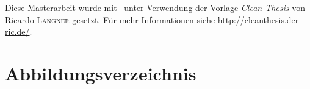 
{%
\renewcommand{\bibfont}{\normalfont\small}
\setlength{\biblabelsep}{0pt}
\setlength{\bibitemsep}{0.5\baselineskip plus 0.5\baselineskip}
\printbibliography
}

\vfill

Diese Masterarbeit wurde mit \LaTeXe\ unter Verwendung der Vorlage \textit{Clean Thesis} von Ricardo \textsc{Langner} gesetzt.
Für mehr Informationen siehe \url{http://cleanthesis.der-ric.de/}.

\chapter*{Abbildungsverzeichnis}
\renewcommand\listfigurename{}
\vspace*{-2.35cm}
\listoffigures

\renewcommand\listalgorithmname{Algorithmenverzeichnis}
\listofalgorithms

\newpage
\renewcommand{\listoflistingscaption}{Listing-Verzeichnis}
\listoflistings

\cleardoublepage

